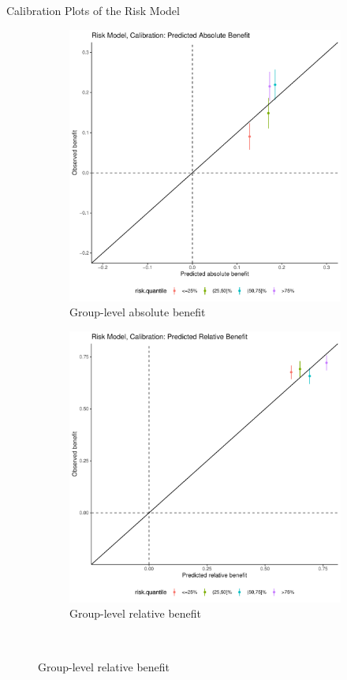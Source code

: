 \documentclass[11pt]{beamer}
\begin{document}
\begin{frame}{Calibration Plots of the Risk Model}
\begin{figure}
\centering
	\begin{subfigure}{0.49\textwidth}
		\includegraphics[width=\linewidth]{plots/const-rm-calibration-absolute.pdf}
		\caption{Group-level absolute benefit}
	\end{subfigure}
	\begin{subfigure}{0.49\textwidth}
		\includegraphics[width=\linewidth]{plots/const-rm-calibration-relative.pdf}
		\caption{Group-level relative benefit}
	\end{subfigure}
\medskip \\


\end{figure}
\end{frame}
\end{document}
